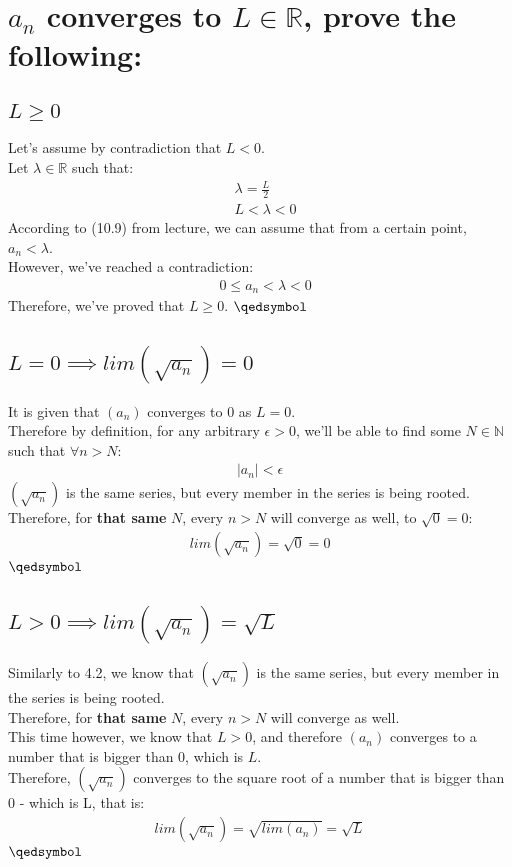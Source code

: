 \documentclass[a4paper, 12pt]{article}
\newcommand{\sub}[1]{\subsection{\underline{#1}}}
\newcommand{\R}{\ensuremath{\mathbb{R}}}
\newcommand{\N}{\ensuremath{\mathbb{N}}}
\newcommand{\eq}[1]{\begin{align*}#1\end{align*}}
\renewcommand{\qed}{\hfill\(\qedsymbol\)}
\begin{document}
\section{$a_n$ converges to $L\in\R$, prove the following:}
\sub{$L\geq{0}$}
Let's assume by contradiction that $L<0$.\\
Let $\lambda\in\R$ such that:
\eq{
    &\lambda=\frac{L}{2}\\
    &L<\lambda<0
}
According to (10.9) from lecture, we can assume that from a certain point, $a_n<\lambda$.\\
However, we've reached a contradiction:
\eq{
    &0\leq a_n<\lambda<0
}
Therefore, we've proved that $L\geq{0}$.
\qed
\sub{$L=0\implies lim(\sqrt{a_n})=0$}
It is given that $(a_n)$ converges to 0 as $L=0$.\\
Therefore by definition, for any arbitrary $\epsilon>0$, we'll be able to find some $N\in\N$ such that $\forall{n}>N$:
\eq{
    |a_n|<\epsilon
}
$(\sqrt{a_n})$ is the same series, but every member in the series is being rooted.\\
Therefore, for \textbf{that same} $N$, every $n>N$ will converge as well, to $\sqrt{0}=0$:
\eq{
    lim(\sqrt{a_n})=\sqrt{0}=0
}
\qed
\sub{$L>0\implies lim(\sqrt{a_n})=\sqrt{L}$}
Similarly to 4.2, we know that $(\sqrt{a_n})$ is the same series, but every member in the series is being rooted.\\
Therefore, for \textbf{that same} $N$, every $n>N$ will converge as well.\\
This time however, we know that $L>0$, and therefore $(a_n)$ converges to a number that is bigger than 0, which is $L$.\\
Therefore, $(\sqrt{a_n})$ converges to the square root of a number that is bigger than 0 - which is L, that is:
\eq{
    lim(\sqrt{a_n})=\sqrt{lim(a_n)}=\sqrt{L}
}
\qed\pagebreak

\end{document}
